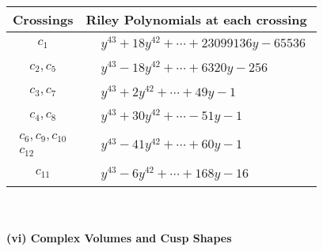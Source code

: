 \documentclass[1p]{elsarticle_modified}
\theoremstyle{definition}
\begin{document}
\begin{tabular}{m{50pt}|m{274pt}}
Crossings & \hspace{64pt}Riley Polynomials at each crossing \\
\hline $$\begin{aligned}c_{1}\end{aligned}$$&$\begin{aligned}
&y^{43}+18 y^{42}+\cdots+23099136 y-65536
\end{aligned}$\\
\hline $$\begin{aligned}c_{2},c_{5}\end{aligned}$$&$\begin{aligned}
&y^{43}-18 y^{42}+\cdots+6320 y-256
\end{aligned}$\\
\hline $$\begin{aligned}c_{3},c_{7}\end{aligned}$$&$\begin{aligned}
&y^{43}+2 y^{42}+\cdots+49 y-1
\end{aligned}$\\
\hline $$\begin{aligned}c_{4},c_{8}\end{aligned}$$&$\begin{aligned}
&y^{43}+30 y^{42}+\cdots-51 y-1
\end{aligned}$\\
\hline $$\begin{aligned}c_{6},c_{9},c_{10}\\c_{12}\end{aligned}$$&$\begin{aligned}
&y^{43}-41 y^{42}+\cdots+60 y-1
\end{aligned}$\\
\hline $$\begin{aligned}c_{11}\end{aligned}$$&$\begin{aligned}
&y^{43}-6 y^{42}+\cdots+168 y-16
\end{aligned}$\\
\hline
\end{tabular}\\~\\
\newpage\flushleft \textbf{(vi) Complex Volumes and Cusp Shapes}
\end{document}
